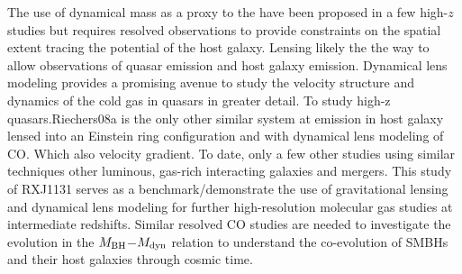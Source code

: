 \documentclass[]{emulateapj}
\begin{document}
The use of dynamical mass as a proxy to the \bhrelation have been proposed in a few high-$z$ studies 
but requires resolved observations to provide constraints on the spatial extent tracing the potential of 
the host galaxy. Lensing likely the the way to allow observations of quasar emission and 
host galaxy emission. Dynamical lens modeling provides a promising avenue to study the velocity 
structure and dynamics of the cold gas in quasars in greater detail. 
To study high-z quasars.Riechers08a is the only other similar system at emission in host galaxy lensed into an Einstein ring configuration and
with dynamical lens modeling of CO.
Which also velocity gradient.
To date, only a few other studies using similar techniques \eg other luminous,
gas-rich interacting galaxies and mergers.
This study of RXJ1131 serves as a benchmark/demonstrate the use of gravitational lensing and 
dynamical lens modeling for further high-resolution molecular gas studies at 
intermediate redshifts.  Similar resolved CO studies are needed to investigate the evolution in 
the $M_{\rm BH}$$-$$M_{\rm dyn}$ relation to understand the co-evolution of SMBHs and their 
host galaxies through cosmic time.
\end{document}
